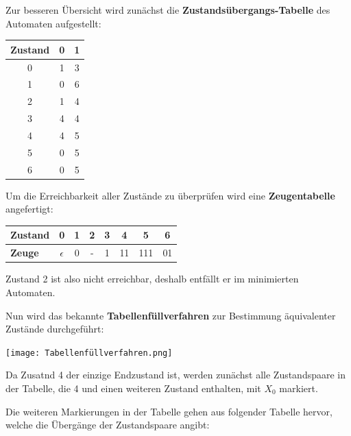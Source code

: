 \begin{teile}
	\item	
	Zur besseren Übersicht wird zunächst die \textbf{Zustandsübergangs-Tabelle} des Automaten aufgestellt:\\
	\begin{tabular}{|c|c|c|}
		\hline
		\textbf{Zustand} & \textbf{0} & \textbf{1} \\
		\hline
		0                & 1          & 3 \\
		\hline
		1                & 0          & 6 \\
		\hline
		2                & 1          & 4 \\
		\hline
		3                & 4          & 4 \\
		\hline
		4                & 4          & 5 \\
		\hline
		5                & 0          & 5 \\
		\hline
		6                & 0          & 5 \\
		\hline
	\end{tabular} 
	
	Um die Erreichbarkeit aller Zustände zu überprüfen wird eine \textbf{Zeugentabelle} angefertigt:\\
	\begin{tabular}{l|ccccccc}
		\textbf{Zustand} & 0          & 1 & 2 & 3 & 4  & 5   & 6 \\
		\hline
		\textbf{Zeuge}   & $\epsilon$ & 0 & - & 1 & 11 & 111 & 01 \\
	\end{tabular} 
	Zustand 2 ist also nicht erreichbar, deshalb entfällt er im minimierten Automaten.
	
	Nun wird das bekannte \textbf{Tabellenfüllverfahren} zur Bestimmung äquivalenter Zustände durchgeführt: 
	
	\texttt{[image: Tabellenfüllverfahren.png]}

	Da Zusatnd 4 der einzige Endzustand ist, werden zunächst alle Zustandspaare in der Tabelle, die 4 und einen weiteren Zustand enthalten, mit $X_0$ markiert.
	
	Die weiteren Markierungen in der Tabelle gehen aus folgender Tabelle hervor, welche die Übergänge der Zustandspaare angibt:


\end{teile}
